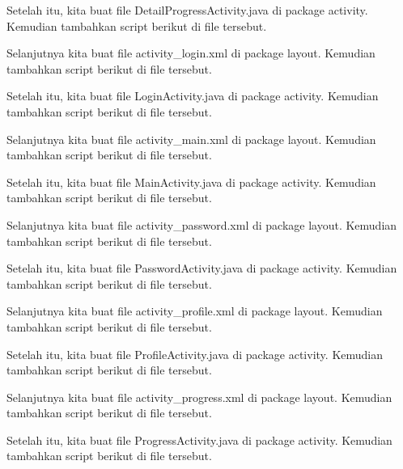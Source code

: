 Setelah itu, kita buat file DetailProgressActivity.java di package activity. Kemudian tambahkan script berikut di file tersebut.


Selanjutnya kita buat file activity\_login.xml di package layout. Kemudian tambahkan script berikut di file tersebut.


Setelah itu, kita buat file LoginActivity.java di package activity. Kemudian tambahkan script berikut di file tersebut.


Selanjutnya kita buat file activity\_main.xml di package layout. Kemudian tambahkan script berikut di file tersebut.


Setelah itu, kita buat file MainActivity.java di package activity. Kemudian tambahkan script berikut di file tersebut.


Selanjutnya kita buat file activity\_password.xml di package layout. Kemudian tambahkan script berikut di file tersebut.


Setelah itu, kita buat file PasswordActivity.java di package activity. Kemudian tambahkan script berikut di file tersebut.


Selanjutnya kita buat file activity\_profile.xml di package layout. Kemudian tambahkan script berikut di file tersebut.


Setelah itu, kita buat file ProfileActivity.java di package activity. Kemudian tambahkan script berikut di file tersebut.


Selanjutnya kita buat file activity\_progress.xml di package layout. Kemudian tambahkan script berikut di file tersebut.


Setelah itu, kita buat file ProgressActivity.java di package activity. Kemudian tambahkan script berikut di file tersebut.


